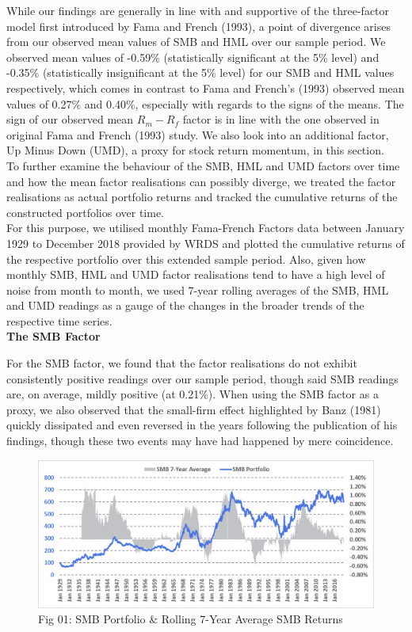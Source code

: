 \documentclass[12pt]{article}
\begin{document}
\noindent While our findings are generally in line with and supportive of the three-factor model first introduced by Fama and French (1993), a point of divergence arises from our observed mean values of SMB and HML over our sample period. We observed mean values of -0.59\% (statistically significant at the 5\% level) and -0.35\% (statistically insignificant at the 5\% level) for our SMB and HML values respectively, which comes in contrast to Fama and French's (1993) observed mean values of 0.27\% and 0.40\%, especially with regards to the signs of the means. The sign of our observed mean $R_m - R_f$ factor is in line with the one observed in original Fama and French (1993) study. We also look into an additional factor, Up Minus Down (UMD), a proxy for stock return momentum, in this section.\\

\noindent To further examine the behaviour of the SMB, HML and UMD factors over time and how the mean factor realisations can possibly diverge, we treated the factor realisations as actual portfolio returns and tracked the cumulative returns of the constructed portfolios over time. \\

\noindent For this purpose, we utilised monthly Fama-French Factors data between January 1929 to December 2018 provided by WRDS and plotted the cumulative returns of the respective portfolio over this extended sample period. Also, given how monthly SMB, HML and UMD factor realisations tend to have a high level of noise from month to month, we used 7-year rolling averages of the SMB, HML and UMD readings as a gauge of the changes in the broader trends of the respective time series.\\

\noindent \textbf{The SMB Factor}

\noindent For the SMB factor, we found that the factor realisations do not exhibit consistently positive readings over our sample period, though said SMB readings are, on average, mildly positive (at 0.21\%). When using the SMB factor as a proxy, we also observed that the small-firm effect highlighted by Banz (1981) quickly dissipated and even reversed in the years following the publication of his findings, though these two events may have had happened by mere coincidence.

\begin{figure}[h]
	\centering
	\includegraphics[width=0.9\linewidth]{SMB01}
	\caption*{Fig 01: SMB Portfolio \& Rolling 7-Year Average SMB Returns}
	\label{fig:label}
\end{figure}
\end{document}
